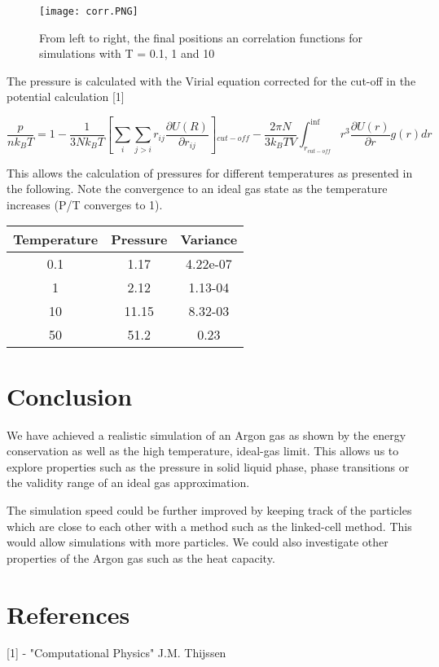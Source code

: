\documentclass[10pt,letterpaper]{article}
\begin{document}
\begin{figure}[H]
\centering
\texttt{[image: corr.PNG]} %
\caption{From left to right, the final positions an correlation functions for simulations with T = 0.1, 1 and 10} %
\end{figure}

The pressure is calculated with the Virial equation corrected for the cut-off in the potential calculation [1]

\begin{equation}
\frac{p}{n{k_B}T} = 1 - \frac{1}{3N{k_B}T}[ \sum_{i}\sum_{j>i}{r_{ij}}\frac{\partial U(R)}{\partial r_{ij}} ]{_{cut-off}} - \frac{2\pi N}{3{k_B}TV}\int_{r_{cut-off}}^{\inf}r^3\frac{\partial U(r)}{\partial r}g(r)dr
\end{equation}

This allows the calculation of pressures for different temperatures as presented in the following. Note the convergence to an ideal gas state as the temperature increases (P/T converges to 1).

\begin{table}[h]
\centering
\begin{tabular}{|c|c|c|}
\hline

Temperature & Pressure & Variance \\ \hline
0.1         & 1.17     & 4.22e-07 \\ \hline
1           & 2.12     & 1.13-04  \\ \hline
10          & 11.15    & 8.32-03  \\ \hline
50          & 51.2     & 0.23     \\ \hline
\end{tabular}
\end{table}


\section{Conclusion}

We have achieved a realistic simulation of an Argon gas as shown by the energy conservation as well as the high temperature, ideal-gas limit. This allows us to explore properties such as the pressure in solid  liquid phase, phase transitions or the validity range of an ideal gas approximation. 

\vspace{5mm}

The simulation speed could be further improved by keeping track of the particles which are close to each other with a method such as the linked-cell method. This would allow simulations with more particles. We could also investigate other properties of the Argon gas such as the heat capacity.

\section{References}
[1] - "Computational Physics" J.M. Thijssen
\end{document}
